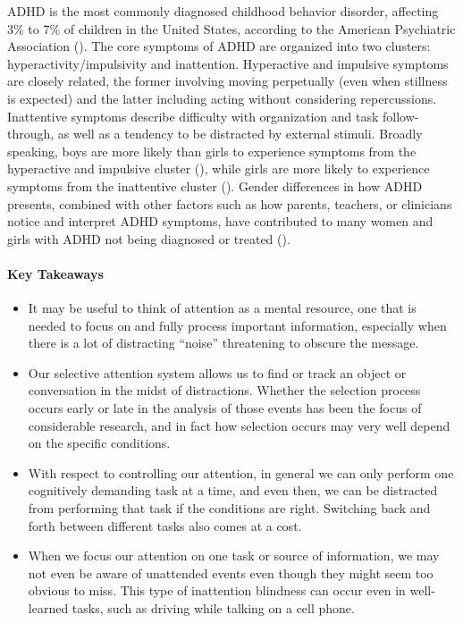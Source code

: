 \documentclass[
]{krantz}
\providecommand{\tightlist}{%
  \setlength{\itemsep}{0pt}\setlength{\parskip}{0pt}}
\begin{document}
ADHD is the most commonly diagnosed childhood behavior disorder, affecting 3\% to 7\% of children in the United States, according to the American Psychiatric Association (). The core symptoms of ADHD are organized into two clusters: hyperactivity/impulsivity and inattention. Hyperactive and impulsive symptoms are closely related, the former involving moving perpetually (even when stillness is expected) and the latter including acting without considering repercussions. Inattentive symptoms describe difficulty with organization and task follow-through, as well as a tendency to be distracted by external stimuli. Broadly speaking, boys are more likely than girls to experience symptoms from the hyperactive and impulsive cluster (), while girls are more likely to experience symptoms from the inattentive cluster (). Gender differences in how ADHD presents, combined with other factors such as how parents, teachers, or clinicians notice and interpret ADHD symptoms, have contributed to many women and girls with ADHD not being diagnosed or treated ().

\paragraph*{Key Takeaways}\label{key-takeaways-2}

\begin{itemize}
\tightlist
\item
  It may be useful to think of attention as a mental resource, one that is needed to focus on and fully process important information, especially when there is a lot of distracting ``noise'' threatening to obscure the message.
\item
  Our selective attention system allows us to find or track an object or conversation in the midst of distractions. Whether the selection process occurs early or late in the analysis of those events has been the focus of considerable research, and in fact how selection occurs may very well depend on the specific conditions.
\item
  With respect to controlling our attention, in general we can only perform one cognitively demanding task at a time, and even then, we can be distracted from performing that task if the conditions are right. Switching back and forth between different tasks also comes at a cost.
\item
  When we focus our attention on one task or source of information, we may not even be aware of unattended events even though they might seem too obvious to miss. This type of inattention blindness can occur even in well-learned tasks, such as driving while talking on a cell phone.
\end{itemize}
\end{document}
